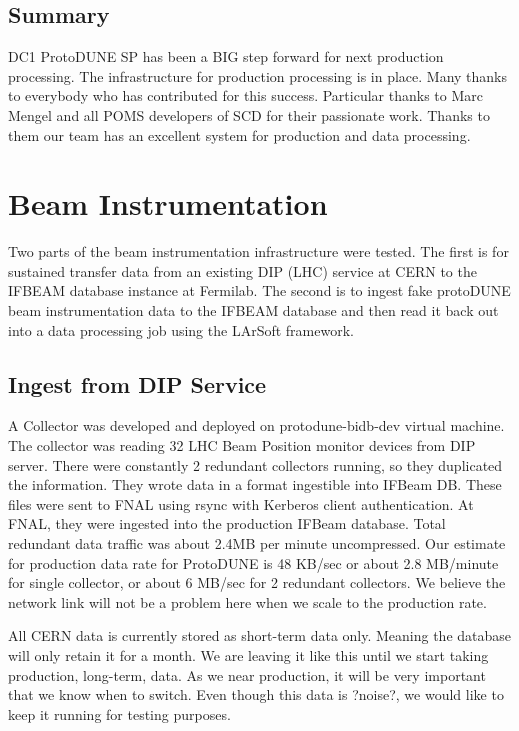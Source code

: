 \documentclass[pdftex,12pt,letter]{article}
\begin{document}
\subsection {Summary}

DC1 ProtoDUNE SP has been a BIG step forward for next production processing.
The infrastructure for production processing is in place.
Many thanks to everybody who has contributed for this success.
Particular thanks to Marc Mengel and all POMS developers of SCD for their passionate work. Thanks to them our team has an excellent system for production and data processing.



\section {Beam Instrumentation}

Two parts of the beam instrumentation infrastructure were tested. The first is for sustained transfer data from an existing DIP (LHC) service at CERN to the IFBEAM database instance at Fermilab. The second is to ingest fake protoDUNE beam instrumentation data to the IFBEAM database and then read it back out into a data processing job using the LArSoft framework. 


\subsection {Ingest from DIP Service}

A Collector was developed and deployed on protodune-bidb-dev virtual machine. The collector was reading 32 LHC Beam Position monitor devices from DIP server. There were constantly 2 redundant collectors running, so they
duplicated the information. They wrote data in a format ingestible into IFBeam DB. These files were sent to FNAL using rsync with Kerberos client authentication. At FNAL, they were ingested into the production IFBeam
database. Total redundant data traffic was about 2.4MB per minute uncompressed. Our estimate for production data rate for ProtoDUNE is 48 KB/sec or about 2.8 MB/minute for single collector, or about 6 MB/sec for 2 redundant
collectors. We believe the network link will not be a problem here when we scale to the production rate. 

All CERN data is currently stored as short-term data only.   Meaning the database will only retain it for a month.   We are leaving it like this until we start taking production, long-term, data.   As we near production, it will be very important that we know when to switch.  Even though this data is ?noise?, we would like to keep it running for testing purposes.
\end{document}
